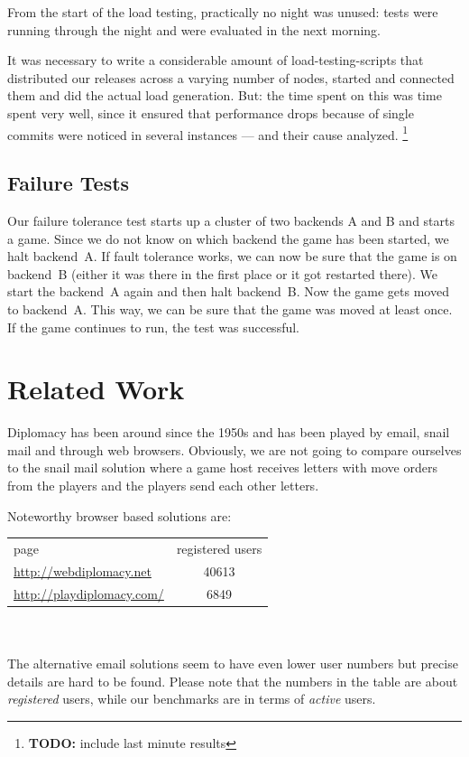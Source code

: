 \documentclass[11pt,a4paper]{report}
\newcommand{\hi}[1]{{\color{red}\em #1\/}\\}
\newcommand{\todo}[1]{\footnote{{\color{red} {\bf TODO:} #1}}}
\begin{document}
From the start of the load testing, practically no night was unused: tests were
running through the night and were evaluated in the next morning.

It was necessary to write a considerable amount of load-testing-scripts that
distributed our releases across a varying number of nodes, started and connected
them and did the actual load generation. But: the time spent on this was time
spent very well, since it ensured that performance drops because of single
commits were noticed in several instances --- and their cause analyzed.
\todo{include last minute results}
\section{Failure Tests}
Our failure tolerance test starts up a cluster of two backends A and B and
starts a game.
Since we do not know on which backend the game has been started, we halt
backend~A. If fault tolerance works, we can now be sure that the game is on
backend~B
(either it was there in the first place or it got restarted there).
We start the backend~A again and then halt backend~B. Now the game gets moved to
backend~A. This way, we can be sure that the game was moved at least once.
If the game continues to run, the test was successful.

\chapter{Related Work}


Diplomacy has been around since the 1950s and has been played by email, snail
mail and through web browsers. Obviously, we are not going to compare ourselves
to the snail mail solution where a game host receives letters with move orders
from the players and the players send each other letters.

Noteworthy browser based solutions are:\\

\begin{tabular}{lc}
  page                            & registered users \\
  \url{http://webdiplomacy.net}   & 40613 \\
  \url{http://playdiplomacy.com/} & 6849
\end{tabular}
\\
\\The alternative email solutions seem to have even lower user numbers but
precise details are hard to be found. Please note that the numbers in
the table are about {\em registered\/} users, while our benchmarks are in terms
of {\em active\/} users.
\end{document}
